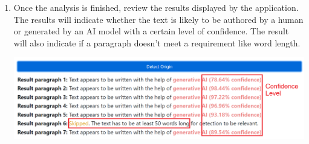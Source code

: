 \begin{enumerate}
    \item Once the analysis is finished, review the results displayed by the application. The results will indicate whether the text is likely to be authored by a human or generated by an AI model with a certain level of confidence. The result will also indicate if a paragraph doesn't meet a requirement like word length.
\begin{center}
    \includegraphics[width=16cm]{Images/Usage/Demo/Results.png}
\end{center}
\end{enumerate}

